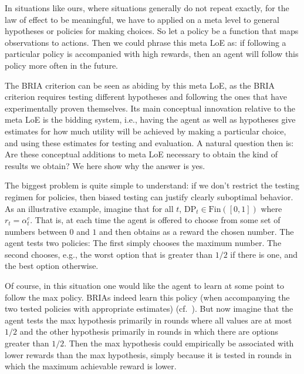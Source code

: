 \documentclass[submission,copyright,creativecommons]{eptcs}
\begin{document}
In situations like ours, where situations generally do not repeat exactly, for the law of effect to be meaningful, we have to applied on a meta level to general hypotheses or policies for making choices. So let a policy be a function that maps observations to actions. Then we could phrase this meta LoE as: if following a particular policy is accompanied with high rewards, then an agent will follow this policy more often in the future.

The BRIA criterion can be seen as abiding by this meta LoE, as the BRIA criterion requires testing different hypotheses and following the ones that have experimentally proven themselves. Its main conceptual innovation relative to the meta LoE is the bidding system, i.e., having the agent as well as hypotheses give estimates for how much utility will be achieved by making a particular choice, and using these estimates for testing and evaluation. A natural question then is: Are these conceptual additions to meta LoE necessary to obtain the kind of results we obtain? We here show why the answer is yes.

The biggest problem is quite simple to understand: if we don't restrict the testing regimen for policies, then biased testing can justify clearly suboptimal behavior. As an illustrative example, imagine that for all $t$, $\mathrm{DP}_t\in \mathrm{Fin}([0,1])$ where $r_t=\alpha^c_t$. That is, at each time the agent is offered to choose from some set of numbers between $0$ and $1$ and then obtains as a reward the chosen number. The agent tests two policies: The first simply chooses the maximum number. The second chooses, e.g., the worst option that is greater than $1/2$ if there is one, and the best option otherwise.

Of course, in this situation one would like the agent to learn at some point to follow the max policy. BRIAs indeed learn this policy (when accompanying the two tested policies with appropriate estimates) (cf.\ ). But now imagine that the agent tests the max hypothesis primarily in rounds where all values are at most $1/2$ and the other hypothesis primarily in rounds in which there are options greater than $1/2$. Then the max hypothesis could empirically be associated with lower rewards than the max hypothesis, simply because it is tested in rounds in which the maximum achievable reward is lower.
\end{document}
